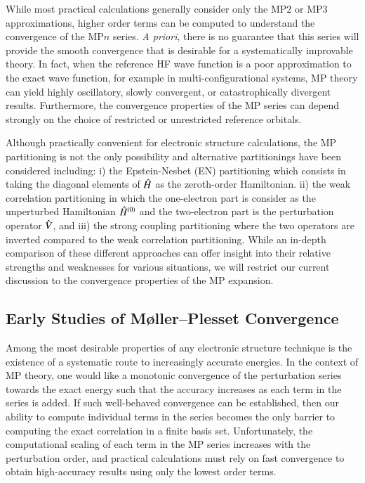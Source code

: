 \documentclass[aps,prb,reprint,noshowkeys,superscriptaddress]{revtex4-1}
\newcommand{\hH}{\Hat{H}}
\newcommand{\hV}{\Hat{V}}
\begin{document}
While most practical calculations generally consider only the MP2 or MP3 approximations, higher order terms can 
be computed to understand the convergence of the MP$n$ series.\cite{Handy_1985}
\textit{A priori}, there is no guarantee that this series will provide the smooth convergence that is desirable for a
systematically improvable theory.
In fact, when the reference HF wave function is a poor approximation to the exact wave function, 
for example in multi-configurational systems, MP theory can yield highly oscillatory, 
slowly convergent, or catastrophically divergent results.\cite{Gill_1986,Gill_1988,Handy_1985,Lepetit_1988,Leininger_2000}
Furthermore, the convergence properties of the MP series can depend strongly on the choice of restricted or
unrestricted reference orbitals.

Although practically convenient for electronic structure calculations, the MP partitioning is not 
the only possibility and alternative partitionings have been considered including: 
i) the Epstein-Nesbet (EN) partitioning which consists in taking the diagonal elements of $\hH$ as the zeroth-order Hamiltonian. \cite{Nesbet_1955,Epstein_1926} 
ii) the weak correlation partitioning in which the one-electron part is consider as the unperturbed Hamiltonian $\hH^{(0)}$ and the two-electron part is the perturbation operator $\hV$, and 
iii) the strong coupling partitioning where the two operators are inverted compared to the weak correlation partitioning. \cite{Seidl_2018}
While an in-depth comparison of these different approaches can offer insight into 
their relative strengths and weaknesses for various situations, we will restrict our current discussion
to the convergence properties of the MP expansion.

\subsection{Early Studies of M{\o}ller--Plesset Convergence} %

Among the most desirable properties of any electronic structure technique is the existence of 
a systematic route to increasingly accurate energies. 
In the context of MP theory, one would like a monotonic convergence of the perturbation
series towards the exact energy such that the accuracy increases as each term in the series is added.
If such well-behaved convergence can be established, then our ability to compute individual 
terms in the series becomes the only barrier to computing the exact correlation in a finite basis set.
Unfortunately, the computational scaling of each term in the MP series increases with the perturbation
order, and practical calculations must rely on fast convergence
to obtain high-accuracy results using only the lowest order terms.
\end{document}
